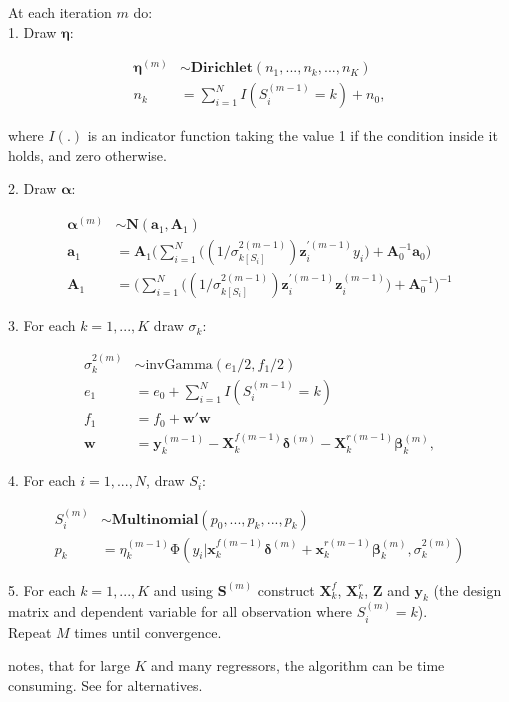 \documentclass[11pt,a4paper]{article}
\begin{document}
\begin{shadedbox}
At each iteration $m$ do:  \\
1. Draw $\mathbf{\eta}$: 

\begin{equation*}
\begin{split}
\bm{\eta}^{(m)} &\sim \mathrm{\mathbf{Dirichlet}}(n_1,..., n_k ,...,n_K) \\
n_k &= \sum_{i=1}^{N} I(S^{(m-1)}_i = k) + n_0, 
\end{split}
\end{equation*}

where $I(.)$ is an indicator function taking the value 1 if the condition inside it holds, and zero otherwise. 

2. Draw $\mathbf{\alpha}$: 

\begin{equation*}
\begin{split}
\boldsymbol{\alpha}^{(m)} &\sim \mathrm{\mathbf{N}}(\textbf{a}_{1}, \textbf{A}_{1}) \\
\textbf{a}_{1} &= \textbf{A}_{1} \bigg ( \sum_{i=1}^{N} \bigg ( ( 1/\sigma^{2(m-1)}_{k[S_i]} )  \textbf{z}^{'(m-1)}_i y_i \bigg ) + \textbf{A}_0^{-1} \textbf{a}_0  \bigg ) \\
\textbf{A}_{1} &= \bigg ( \sum_{i=1}^{N} \bigg ( ( 1/\sigma^{2(m-1)}_{k[S_i]} ) \textbf{z}^{'(m-1)}_i  \textbf{z}^{(m-1)}_i \bigg ) + \textbf{A}_0^{-1} \bigg )^{-1} 
\end{split}
\end{equation*}

3. For each $k=1,...,K$ draw $\sigma_k$: 

\begin{equation*}
\begin{split}
\sigma^{2(m)}_k &\sim \mathrm{invGamma}(e_1/2, f_1/2) \\
e_1 &= e_0 + \sum_{i=1}^{N} I(S^{(m-1)}_i = k)  \\
f_1 &= f_0 + \mathbf{w}'\mathbf{w} \\ 
\mathbf{w} &= \textbf{y}^{(m-1)}_k - \mathbf{X}_k^{f(m-1)} \bm{\delta}^{(m)} - \mathbf{X}_k^{r(m-1)} \bm{\beta}^{(m)}_{k},  
\end{split}
\end{equation*}

4. For each $i=1,...,N$, draw $S_i$: 

\begin{equation*}
\begin{split}
	S_i^{(m)} &\sim \mathrm{\mathbf{Multinomial}}(p_0,...,p_k,...,p_k) \\
	p_k &= \eta_k^{(m-1)} \mathrm{\Phi} ( y_{i} | \mathbf{x}_k^{f(m-1)} \bm{\delta}^{(m)} + \mathbf{x}_k^{r(m-1)} \bm{\beta}^{(m)}_{k}, \sigma_k^{2(m)} )
\end{split}
\end{equation*}

5. For each $k=1,...,K$ and using $\mathbf{S}^{(m)}$ construct $\mathbf{X}_k^f$, $\mathbf{X}_k^r$, $\mathbf{Z}$ and $\mathbf{y}_k$ (the design matrix and dependent variable for all observation where $S_i^{(m)}=k$).  \\

Repeat $M$ times until convergence. 
\end{shadedbox}

\citet{FruehwirthSchnatter.2006} notes, that for large $K$ and many regressors, the algorithm can be time consuming. See \citet[p. 259]{FruehwirthSchnatter.2006} for alternatives. 



\end{document}
